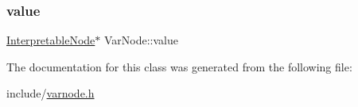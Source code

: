 \subsubsection{\texorpdfstring{value}{value}}
{\footnotesize\ttfamily \hyperlink{classInterpretableNode}{Interpretable\+Node}$\ast$ Var\+Node\+::value}



The documentation for this class was generated from the following file\+:\begin{DoxyCompactItemize}
\item 
include/\hyperlink{varnode_8h}{varnode.\+h}\end{DoxyCompactItemize}
